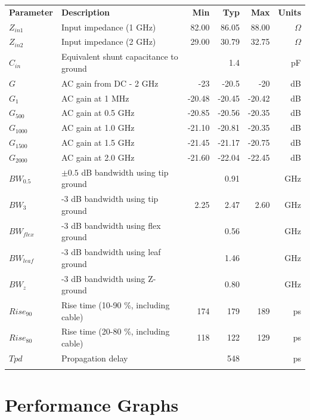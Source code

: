 \documentclass[11pt]{article}
\newcommand{\thinhline}{\Xhline{1\arrayrulewidth}}
\newcommand{\thickhline}{\Xhline{2.5\arrayrulewidth}}
\begin{document}
\begin{tabularx}{16cm}{lXrrrr}
\thickhline
\textbf{Parameter} & \textbf{Description} & \textbf{Min} & \textbf{Typ} & \textbf{Max} & \textbf{Units} \\
\thickhline
$Z_{in1}$ & Input impedance (1 GHz) & 82.00 & 86.05 & 88.00 & $\Omega$ \\
\thinhline
$Z_{in2}$ & Input impedance (2 GHz) & 29.00 & 30.79 & 32.75 & $\Omega$ \\
\thinhline
$C_{in}$ & Equivalent shunt capacitance to ground &  & 1.4 &  & pF \\
\thinhline
$G$ & AC gain from DC - 2 GHz & -23 & -20.5 & -20 & dB \\
\thinhline
$G_1$ & AC gain at 1 MHz & -20.48 & -20.45 & -20.42 & dB \\
\thinhline
$G_{500}$ & AC gain at 0.5 GHz & -20.85 & -20.56 & -20.35 & dB \\
\thinhline
$G_{1000}$ & AC gain at 1.0 GHz & -21.10 & -20.81 & -20.35 & dB \\
\thinhline
$G_{1500}$ & AC gain at 1.5 GHz & -21.45 & -21.17 & -20.75 & dB \\
\thinhline
$G_{2000}$ & AC gain at 2.0 GHz & -21.60 & -22.04 & -22.45 & dB \\
\thinhline
$BW_{0.5}$ & $\pm 0.5$ dB bandwidth using tip ground &  & 0.91 & & GHz \\
\thinhline
$BW_{3}$ & -3 dB bandwidth using tip ground & 2.25 & 2.47 & 2.60 & GHz \\
\thinhline
$BW_{flex}$ & -3 dB bandwidth using flex ground &  & 0.56 &  & GHz \\
\thinhline
$BW_{leaf}$ & -3 dB bandwidth using leaf ground &  & 1.46 &  & GHz \\
\thinhline
$BW_{z}$ & -3 dB bandwidth using Z-ground &  & 0.80 &  & GHz \\
\thinhline
$Rise_{90}$ & Rise time (10-90 \%, including cable) & 174 & 179 & 189 & ps \\
\thinhline
$Rise_{80}$ & Rise time (20-80 \%, including cable) & 118 & 122 & 129 & ps \\
\thinhline
$Tpd$ & Propagation delay &  & 548 &  & ps \\
\thickhline
\end{tabularx}

\pagebreak
\section{Performance Graphs}
\end{document}
